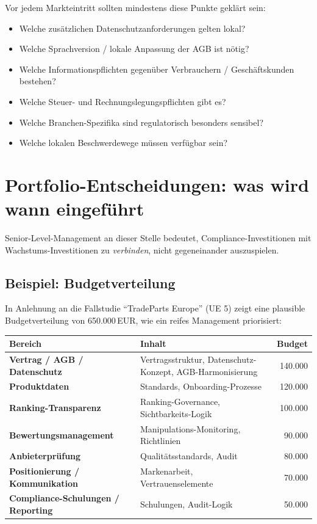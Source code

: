 \documentclass[11pt,a4paper,oneside]{article}
\begin{document}
Vor jedem Markteintritt sollten mindestens diese Punkte geklärt sein:

\begin{itemize}
  \item Welche zusätzlichen Datenschutzanforderungen gelten lokal?
  \item Welche Sprachversion / lokale Anpassung der AGB ist nötig?
  \item Welche Informationspflichten gegenüber Verbrauchern / Geschäftskunden bestehen?
  \item Welche Steuer- und Rechnungslegungspflichten gibt es?
  \item Welche Branchen-Spezifika sind regulatorisch besonders sensibel?
  \item Welche lokalen Beschwerdewege müssen verfügbar sein?
\end{itemize}

\section{Portfolio-Entscheidungen: was wird wann eingeführt}

Senior-Level-Management an dieser Stelle bedeutet, Compliance-Investitionen mit Wachstums-Investitionen zu \emph{verbinden}, nicht gegeneinander auszuspielen.

\subsection{Beispiel: Budgetverteilung}

\noindent In Anlehnung an die Fallstudie ``TradeParts Europe'' (UE 5) zeigt eine plausible Budgetverteilung von 650.000\,EUR, wie ein reifes Management priorisiert:

\begin{tabularx}{\linewidth}{@{}>{\bfseries}lXr@{}}
\toprule
Bereich & Inhalt & Budget \\
\midrule
Vertrag / AGB / Datenschutz & Vertragsstruktur, Datenschutz-Konzept, AGB-Harmonisierung & 140.000 \\
Produktdaten & Standards, Onboarding-Prozesse & 120.000 \\
Ranking-Transparenz & Ranking-Governance, Sichtbarkeits-Logik & 100.000 \\
Bewertungsmanagement & Manipulations-Monitoring, Richtlinien & 90.000 \\
Anbieterprüfung & Qualitätsstandards, Audit & 80.000 \\
Positionierung / Kommunikation & Markenarbeit, Vertrauenselemente & 70.000 \\
Compliance-Schulungen / Reporting & Schulungen, Audit-Logik & 50.000 \\
\bottomrule
\end{tabularx}
\end{document}
